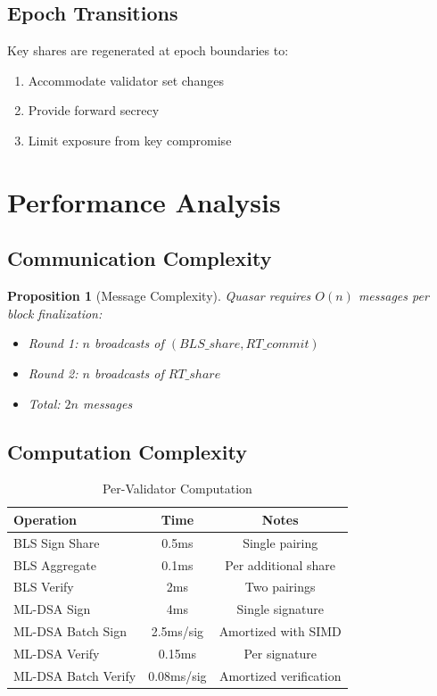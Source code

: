 \documentclass[11pt,a4paper]{article}
\newtheorem{proposition}[theorem]{Proposition}
\begin{document}
\subsection{Epoch Transitions}

Key shares are regenerated at epoch boundaries to:
\begin{enumerate}
    \item Accommodate validator set changes
    \item Provide forward secrecy
    \item Limit exposure from key compromise
\end{enumerate}

\section{Performance Analysis}

\subsection{Communication Complexity}

\begin{proposition}[Message Complexity]
Quasar requires $O(n)$ messages per block finalization:
\begin{itemize}
    \item Round 1: $n$ broadcasts of $(BLS\_share, RT\_commit)$
    \item Round 2: $n$ broadcasts of $RT\_share$
    \item Total: $2n$ messages
\end{itemize}
\end{proposition}

\subsection{Computation Complexity}

\begin{table}[h]
\centering
\caption{Per-Validator Computation}
\begin{tabular}{@{}lcc@{}}
\toprule
Operation & Time & Notes \\
\midrule
BLS Sign Share & 0.5ms & Single pairing \\
BLS Aggregate & 0.1ms & Per additional share \\
BLS Verify & 2ms & Two pairings \\
ML-DSA Sign & 4ms & Single signature \\
ML-DSA Batch Sign & 2.5ms/sig & Amortized with SIMD \\
ML-DSA Verify & 0.15ms & Per signature \\
ML-DSA Batch Verify & 0.08ms/sig & Amortized verification \\
\bottomrule
\end{tabular}
\end{table}
\end{document}
